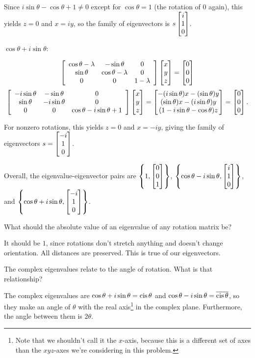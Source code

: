 \documentclass[../key.tex]{subfiles}
\begin{document}
Since $i\sin\theta - \cos\theta + 1 \neq 0$ except for $\cos\theta=1$ (the rotation of $0$ again), this yields $z=0$ and $x=iy$, so the family of eigenvectors is $s\begin{bmatrix} i \\ 1 \\ 0 \end{bmatrix}$.

$\cos\theta + i\sin\theta$:

$$\left[\begin{array}{ccc} \cos\theta - \lambda & -\sin\theta & 0 \\ \sin\theta & \cos\theta- \lambda & 0 \\ 0 & 0 & 1- \lambda \end{array}\right]\begin{bmatrix} x \\ y \\ z \end{bmatrix} = \begin{bmatrix} 0 \\ 0 \\ 0 \end{bmatrix}$$
$$\left[\begin{array}{ccc} -i\sin\theta & -\sin\theta & 0 \\ \sin\theta & -i\sin\theta & 0 \\ 0 & 0 &  \cos\theta - i\sin\theta + 1 \end{array}\right]\begin{bmatrix} x \\ y \\ z \end{bmatrix}=\begin{bmatrix} -(i\sin\theta)x-(\sin\theta)y \\ (\sin\theta)x-(i\sin\theta)y \\ (1-i\sin\theta-\cos\theta)z \end{bmatrix} =\begin{bmatrix} 0 \\ 0 \\ 0 \end{bmatrix}.$$

For nonzero rotations, this yields $z=0$ and $x=-iy$, giving the family of eigenvectors $s=\begin{bmatrix} -i \\ 1 \\ 0 \end{bmatrix}$.

Overall, the eigenvalue-eigenvector pairs are $\left\{1, \begin{bmatrix} 0 \\ 0 \\ 1 \end{bmatrix}\right\}$, $\left\{\cos\theta - i\sin\theta, \begin{bmatrix} i \\ 1 \\ 0 \end{bmatrix}\right\}$, and $\left\{\cos\theta + i\sin\theta, \begin{bmatrix} -i \\ 1 \\ 0 \end{bmatrix}\right\}$.

\begin{outer_problem}
\item
\end{outer_problem}

\begin{inner_problem}
\item What should the absolute value of an eigenvalue of any rotation matrix be?
\end{inner_problem}

It should be $1$, since rotations don't stretch anything and doesn't change orientation. All distances are preserved. This is true of our eigenvectors.

\begin{inner_problem}
\item The complex eigenvalues relate to the angle of rotation. What is that relationship?
\end{inner_problem}

The complex eigenvalues are $\cos\theta + i\sin\theta=\operatorname{cis}\theta$ and $\cos\theta - i\sin\theta=\overline{\operatorname{cis}\theta}$, so they make an angle of $\theta$ with the real axis\footnote{Note that we shouldn't call it the $x$-axis, because this is a different set of axes than the $xyz$-axes we're considering in this problem.} in the complex plane. Furthermore, the angle between them is $2\theta$.
\end{document}
